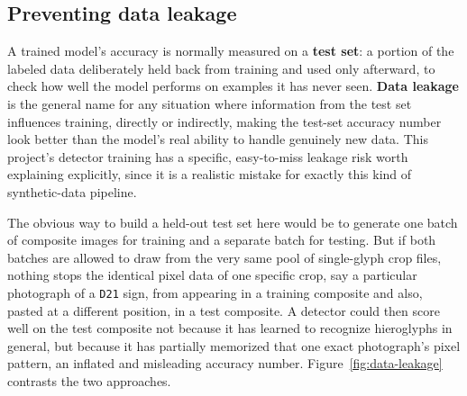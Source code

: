 \documentclass[11pt,a4paper]{report}
\begin{document}
\subsection{Preventing data leakage}
\label{sec:leakage}

A trained model's accuracy is normally measured on a \textbf{test set}: a
portion of the labeled data deliberately held back from training and used
only afterward, to check how well the model performs on examples it has
never seen. \textbf{Data leakage} is the general name for any situation
where information from the test set influences training, directly or
indirectly, making the test-set accuracy number look better than the
model's real ability to handle genuinely new data. This project's detector
training has a specific, easy-to-miss leakage risk worth explaining
explicitly, since it is a realistic mistake for exactly this kind of
synthetic-data pipeline.

The obvious way to build a held-out test set here would be to generate one
batch of composite images for training and a separate batch for testing.
But if both batches are allowed to draw from the very same pool of
single-glyph crop files, nothing stops the identical pixel data of one
specific crop, say a particular photograph of a \texttt{D21} sign, from
appearing in a training composite and also, pasted at a different position,
in a test composite. A detector could then score well on the test composite
not because it has learned to recognize hieroglyphs in general, but because
it has partially memorized that one exact photograph's pixel pattern, an
inflated and misleading accuracy number.
Figure~\ref{fig:data-leakage} contrasts the two approaches.
\end{document}
